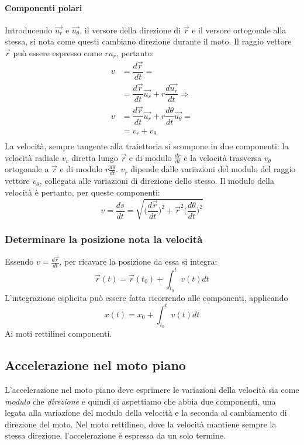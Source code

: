 \documentclass[class=book, crop=false, oneside, 12pt]{standalone}
\begin{document}
			\paragraph{Componenti polari}
      Introducendo $\overrightarrow{u_r}$ e $\overrightarrow{u_\theta}$, il versore della direzione di $\overrightarrow{r}$ e il versore ortogonale alla stessa, si nota come questi cambiano direzione durante il moto.
      Il raggio vettore $\overrightarrow{r}$ pu\`o essere espresso come $ru_r$, pertanto:
			\begin{align*}
        v&=\dfrac{d\overrightarrow{r}}{dt}=\\
         &=\dfrac{d\overrightarrow{r}}{dt}\overrightarrow{u_r}+r\dfrac{d\overrightarrow{u_r}}{dt}\Rightarrow\\
        v&=\dfrac{d\overrightarrow{r}}{dt}\overrightarrow{u_r}+r\dfrac{d\theta}{dt}\overrightarrow{u_\theta}=\\
				 &=v_r+v_\theta\\
			\end{align*}
      La velocit\`a, sempre tangente alla traiettoria si scompone in due componenti: la velocit\`a radiale $v_r$ diretta lungo $\overrightarrow{r}$ e di modulo $\frac{dr}{dt}$ e la velocit\`a trasversa $v_\theta$ ortogonale a $\overrightarrow{r}$ e di modulo $r\frac{d\theta}{dt}$.
			$v_r$ dipende dalle variazioni del modulo del raggio vettore $v_\theta$, collegata alle variazioni di direzione dello stesso.
			Il modulo della velocit\`a \`e pertanto, per queste componenti:
      $$v=\dfrac{ds}{dt}=\sqrt{\biggl(\dfrac{d\overrightarrow{r}}{dt}\biggr)^2+\overrightarrow{r}^2\biggl(\dfrac{d\theta}{dt}\biggr)^2}$$
		\subsubsection{Determinare la posizione nota la velocit\`a}
    Essendo $v=\frac{d\overrightarrow{r}}{dt}$, per ricavare la posizione da essa si integra:
    $$\overrightarrow{r}(t)=\overrightarrow{r}(t_0)+\int_{t_0}^tv(t)dt$$
		L'integrazione esplicita pu\`o essere fatta ricorrendo alle componenti, applicando
		$$x(t)=x_0+\int_{t_0}^tv(t)dt$$
		Ai moti rettilinei componenti.
  \subsection{Accelerazione nel moto piano}
  L'accelerazione nel moto piano deve esprimere le variazioni della velocità sia come \emph{modulo} che \emph{direzione} e quindi ci aspettiamo che abbia due componenti,
  una legata alla variazione del modulo della velocità e la seconda al cambiamento di direzione del moto.
  Nel moto rettilineo, dove la velocità mantiene sempre la stessa direzione, l'accelerazione è espressa da un solo termine.
\end{document}
